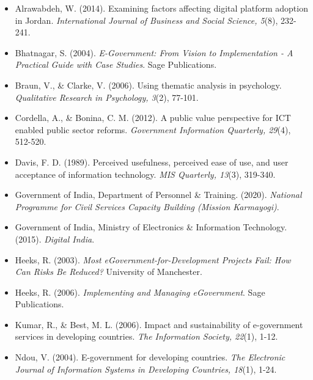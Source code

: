 \documentclass[11pt,a4paper]{article}
\begin{document}
\vspace{0.2cm}
\small
\begin{itemize}[leftmargin=1.5em, itemindent=-1.5em, label={}]
\item Alrawabdeh, W. (2014). Examining factors affecting digital platform adoption in Jordan. \textit{International Journal of Business and Social Science, 5}(8), 232-241.

\item Bhatnagar, S. (2004). \textit{E-Government: From Vision to Implementation - A Practical Guide with Case Studies}. Sage Publications.

\item Braun, V., \& Clarke, V. (2006). Using thematic analysis in psychology. \textit{Qualitative Research in Psychology, 3}(2), 77-101.

\item Cordella, A., \& Bonina, C. M. (2012). A public value perspective for ICT enabled public sector reforms. \textit{Government Information Quarterly, 29}(4), 512-520.

\item Davis, F. D. (1989). Perceived usefulness, perceived ease of use, and user acceptance of information technology. \textit{MIS Quarterly, 13}(3), 319-340.

\item Government of India, Department of Personnel \& Training. (2020). \textit{National Programme for Civil Services Capacity Building (Mission Karmayogi)}.

\item Government of India, Ministry of Electronics \& Information Technology. (2015). \textit{Digital India}.

\item Heeks, R. (2003). \textit{Most eGovernment-for-Development Projects Fail: How Can Risks Be Reduced?} University of Manchester.

\item Heeks, R. (2006). \textit{Implementing and Managing eGovernment}. Sage Publications.

\item Kumar, R., \& Best, M. L. (2006). Impact and sustainability of e-government services in developing countries. \textit{The Information Society, 22}(1), 1-12.

\item Ndou, V. (2004). E-government for developing countries. \textit{The Electronic Journal of Information Systems in Developing Countries, 18}(1), 1-24.


\end{itemize}
\end{document}
